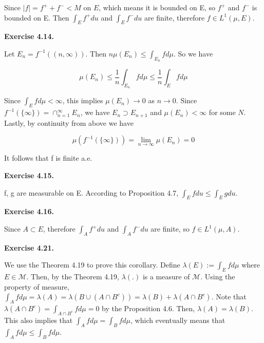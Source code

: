 \documentclass[12pt]{article}
\newcommand{\abs}[1]{\left| #1 \right|}
\begin{document}
Since $\abs{f} = f^{+} + f^{-} < M$ on $E$, which means it is bounded on E, so $f^{+}$ and $f^{-}$ is bounded on E. Then $\int_{E}f^{+}du$ and $\int_{E}f^{-}du$ are finite, therefore $f \in L^{1}(\mu, E)$.

\textbf{Exercise 4.14.}

Let $E_n = f^{-1}((n,\infty))$. Then $n\mu(E_n) \leq \int_{E_n} fd\mu$. So we have

$$ \mu(E_n) \leq \frac{1}{n} \int_{E_n}  fd\mu \leq  \frac{1}{n} \int_{E}  fd\mu  $$

Since  $\int_{E}  fd\mu < \infty$, this implies $\mu(E_n) \rightarrow 0$ as $n \rightarrow 0$. Since $f^{-1}(\{\infty\}) = \cap_{n=1}^{\infty}E_{n}$, we have $E_{n} \supset E_{n+1}$ and $\mu(E_n) < \infty$ for some $N$. Lastly, by continuity from above we have

$$\mu(f^{-1}(\{\infty\})) = \lim_{n \rightarrow \infty} \mu(E_n) = 0$$

It follows that f is finite a.e.

\textbf{Exercise 4.15.}

f, g are measurable on E. According to Proposition 4.7, $\int_{E}f du \leq \int_{E}g du$.

\textbf{Exercise 4.16.}

Since $A \subset E$, therefore $\int_{A}f^{+} du$ and $\int_{A}f^{-} du$ are finite, so $f \in L^{1}(\mu, A)$.

\textbf{Exercise 4.21.}

We use the Theorem 4.19 to prove this corollary. Define $\lambda (E) := \int_{E} f d\mu$ where $E \in \mathcal{M}$. Then, by the Theorem 4.19, $\lambda(.)$ is a measure of $\mathcal{M}$. Using the property of measure, $\int_{A} f d \mu = \lambda(A) = \lambda(B \cup (A \cap B^{c})) = \lambda(B) + \lambda(A \cap B^{c})$. Note that $\lambda(A \cap B^{c}) = \int_{A \cap B^{c}} f d\mu =0$ by the Proposition 4.6. Then, $\lambda(A) = \lambda(B)$. This also implies that $\int_{A}f d\mu = \int_{B}f d\mu$, which eventually means that $\int_{A}f d\mu \leq \int_{B}f d\mu$. \  \\
 
\end{document}
